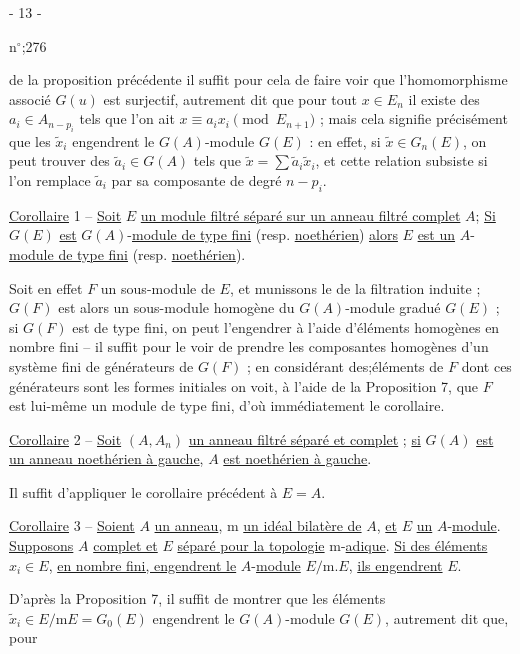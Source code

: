 \begin{center}- 13 -\end{center}
\hfill n$^\circ$;276

de la proposition précédente il suffit pour cela de faire voir que l'homomorphisme associé $G(u)$ est surjectif, autrement dit que pour tout $x\in E_n$ il existe des $a_i\in A_{n-p_i}$ tels que l'on ait $x\equiv a_ix_i\pmod{E_{n+1}}$ ; mais cela signifie précisément que les $\tilde x_i$ engendrent le $G(A)$-module $G(E)$ : en effet, si $\tilde x\in G_n(E)$, on peut trouver des $\tilde a_i\in G(A)$ tels que $\tilde x=\sum\tilde a_i\tilde x_i$, et cette relation subsiste si l'on remplace $\tilde a_i$ par sa composante de degré $n-p_i$.

\uline{Corollaire} 1 -- \uline{Soit} $E$ \uline{un module filtré séparé sur un anneau filtré complet} $A$; \uline{Si} $G(E)$ \uline{est}  $G(A)$-\uline{module de type fini} (resp. \uline{noethérien}) \uline{alors} $E$ \uline{est un} $A$-\uline{module de type fini} (resp. \uline{noethérien}).

Soit en effet $F$ un sous-module de $E$, et munissons le de la filtration induite ; $G(F)$ est alors un sous-module homogène du $G(A)$-module gradué $G(E)$ ; si $G(F)$ est de type fini, on peut l'engendrer à l'aide d'éléments homogènes en nombre fini -- il suffit pour le voir de prendre les composantes homogènes d'un système fini de générateurs de $G(F)$ ; en considérant des;éléments de $F$ dont ces générateurs sont les formes initiales on voit, à l'aide de la Proposition 7, que $F$ est lui-même un module de type fini, d'où immédiatement le corollaire.

\uline{Corollaire} 2 -- \uline{Soit} $(A,A_n)$ \uline{un anneau filtré séparé et complet} ; \uline{si} $G(A)$ \uline{est un anneau noethérien à gauche}, $A$ \uline{est noethérien à gauche}.

Il suffit d'appliquer le corollaire précédent à $E=A$.

\uline{Corollaire} 3 -- \uline{Soient} $A$ \uline{un anneau}, $\mathrm m$ \uline{un idéal bilatère de} $A$, \uline{et} $E$ \uline{un} $A$-\uline{module}. \uline{Supposons} $A$ \uline{complet et} $E$ \uline{séparé pour la topologie} $\mathrm m$-\uline{adique}. \uline{Si des éléments} $x_i\in E$, \uline{en nombre fini, engendrent le} $A$-\uline{module} $E/\mathrm m.E$, \uline{ils engendrent} $E$.

D'après la Proposition 7, il suffit de montrer que les éléments $\tilde x_i\in E/\mathrm m E=G_0(E)$ engendrent le $G(A)$-module $G(E)$, autrement dit que, pour

